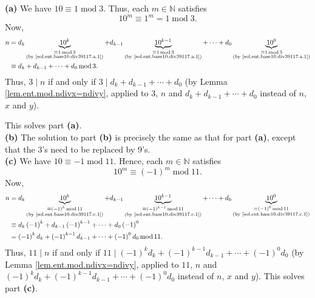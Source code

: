 \documentclass[paper=a4, fontsize=12pt]{scrartcl}%
\theoremstyle{plainsl}
\theoremstyle{definition}
\theoremstyle{remark}
\begin{document}
\textbf{(a)} We have $10\equiv1\operatorname{mod}3$. Thus, each $m\in
\mathbb{N}$ satisfies
\begin{equation}
10^{m}\equiv1^{m}=1\operatorname{mod}3. \label{sol.ent.base10.div39117.a.1}%
\end{equation}
Now,%
\begin{align*}
n  &  =d_{k}\underbrace{10^{k}}_{\substack{\equiv1\operatorname{mod}%
3\\\text{(by \eqref{sol.ent.base10.div39117.a.1})}}}+d_{k-1}%
\underbrace{10^{k-1}}_{\substack{\equiv1\operatorname{mod}3\\\text{(by
\eqref{sol.ent.base10.div39117.a.1})}}}+\cdots+d_{0}\underbrace{10^{0}%
}_{\substack{\equiv1\operatorname{mod}3\\\text{(by
\eqref{sol.ent.base10.div39117.a.1})}}}\\
&  \equiv d_{k}+d_{k-1}+\cdots+d_{0}\operatorname{mod}3.
\end{align*}
Thus, $3\mid n$ if and only if $3\mid d_{k}+d_{k-1}+\cdots+d_{0}$ (by Lemma
\ref{lem.ent.mod.ndivx=ndivy}, applied to $3$, $n$ and $d_{k}+d_{k-1}%
+\cdots+d_{0}$ instead of $n$, $x$ and $y$).

This solves part \textbf{(a)}. \\[0.4cm]

\textbf{(b)} The solution to part \textbf{(b)} is precisely the same as that
for part \textbf{(a)}, except that the $3$'s need to be replaced by $9$'s.
\\[0.4cm]

\textbf{(c)} We have $10\equiv-1\operatorname{mod}11$. Hence, each
$m\in\mathbb{N}$ satisfies
\begin{equation}
10^{m}\equiv\left(  -1\right)  ^{m}\operatorname{mod}11.
\label{sol.ent.base10.div39117.c.1}%
\end{equation}
Now,%
\begin{align*}
n  &  =d_{k}\underbrace{10^{k}}_{\substack{\equiv\left(  -1\right)
^{k}\operatorname{mod}11\\\text{(by \eqref{sol.ent.base10.div39117.c.1})}%
}}+d_{k-1}\underbrace{10^{k-1}}_{\substack{\equiv\left(  -1\right)
^{k-1}\operatorname{mod}11\\\text{(by \eqref{sol.ent.base10.div39117.c.1})}%
}}+\cdots+d_{0}\underbrace{10^{0}}_{\substack{\equiv\left(  -1\right)
^{0}\operatorname{mod}11\\\text{(by \eqref{sol.ent.base10.div39117.c.1})}}}\\
&  \equiv d_{k}\left(  -1\right)  ^{k}+d_{k-1}\left(  -1\right)  ^{k-1}%
+\cdots+d_{0}\left(  -1\right)  ^{0}\\
&  =\left(  -1\right)  ^{k}d_{k}+\left(  -1\right)  ^{k-1}d_{k-1}%
+\cdots+\left(  -1\right)  ^{0}d_{0}\operatorname{mod}11.
\end{align*}
Thus, $11\mid n$ if and only if $11\mid\left(  -1\right)  ^{k}d_{k}+\left(
-1\right)  ^{k-1}d_{k-1}+\cdots+\left(  -1\right)  ^{0}d_{0}$ (by Lemma
\ref{lem.ent.mod.ndivx=ndivy}, applied to $11$, $n$ and $\left(  -1\right)
^{k}d_{k}+\left(  -1\right)  ^{k-1}d_{k-1}+\cdots+\left(  -1\right)  ^{0}%
d_{0}$ instead of $n$, $x$ and $y$). This solves part \textbf{(c)}. \\[0.4cm]
\end{document}
